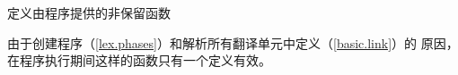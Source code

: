 定义由\cpp{}程序提供的非保留函数

\begin{note}
  由于创建程序（\ref{lex.phases}）和解析所有翻译单元中定义（\ref{basic.link}）的
  原因，在程序执行期间这样的函数只有一个定义有效。
\end{note}

